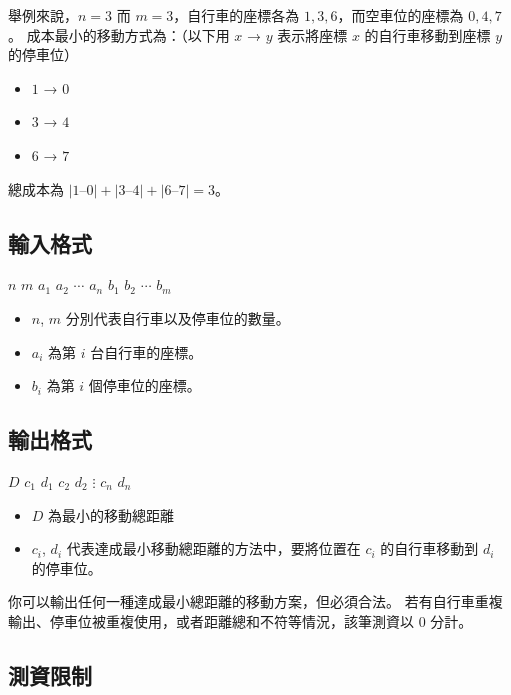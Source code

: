 舉例來說，\(n = 3\) 而 \(m = 3\)，自行車的座標各為
\(1, 3, 6\)，而空車位的座標為 \(0, 4, 7\)。
成本最小的移動方式為：（以下用 \(x\) → \(y\) 表示將座標 \(x\)
的自行車移動到座標 \(y\) 的停車位）

\begin{itemize}
\tightlist
\item
  \(1\) → \(0\)
\item
  \(3\) → \(4\)
\item
  \(6\) → \(7\)
\end{itemize}

總成本為 \(|1 – 0| + |3 – 4| +|6 – 7| = 3\)。

\subsection{輸入格式}

\begin{format}
\f{
$n$ $m$
$a_1$ $a_2$ $\cdots$ $a_n$
$b_1$ $b_2$ $\cdots$ $b_m$
}
\end{format}

\begin{itemize}
\tightlist
\item
  \(n\), \(m\) 分別代表自行車以及停車位的數量。
\item
  \(a_i\) 為第 \(i\) 台自行車的座標。
\item
  \(b_i\) 為第 \(i\) 個停車位的座標。
\end{itemize}

\subsection{輸出格式}

\begin{format}
\f{
$D$
$c_1$ $d_1$
$c_2$ $d_2$
$\vdots$
$c_n$ $d_n$
}
\end{format}

\begin{itemize}
\tightlist
\item
  \(D\) 為最小的移動總距離
\item
  \(c_i\), \(d_i\) 代表達成最小移動總距離的方法中，要將位置在 \(c_i\)
  的自行車移動到 \(d_i\) 的停車位。
\end{itemize}

你可以輸出任何一種達成最小總距離的移動方案，但必須合法。
若有自行車重複輸出、停車位被重複使用，或者距離總和不符等情況，該筆測資以
\(0\) 分計。

\subsection{測資限制}

